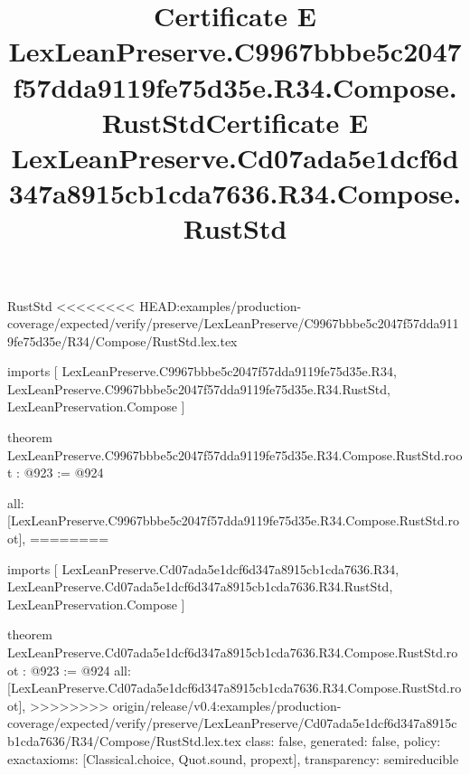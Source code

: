 \begin{lexlean}{RustStd}
<<<<<<<< HEAD:examples/production-coverage/expected/verify/preserve/LexLeanPreserve/C9967bbbe5c2047f57dda9119fe75d35e/R34/Compose/RustStd.lex.tex
\title{Certificate E LexLeanPreserve.C9967bbbe5c2047f57dda9119fe75d35e.R34.Compose.RustStd}
\begin{coremodule}
imports [
  LexLeanPreserve.C9967bbbe5c2047f57dda9119fe75d35e.R34,
  LexLeanPreserve.C9967bbbe5c2047f57dda9119fe75d35e.R34.RustStd,
  LexLeanPreservation.Compose
]

theorem LexLeanPreserve.C9967bbbe5c2047f57dda9119fe75d35e.R34.Compose.RustStd.root : @923 := @924 {
  all: [LexLeanPreserve.C9967bbbe5c2047f57dda9119fe75d35e.R34.Compose.RustStd.root],
========
\title{Certificate E LexLeanPreserve.Cd07ada5e1dcf6d347a8915cb1cda7636.R34.Compose.RustStd}
\begin{coremodule}
imports [
  LexLeanPreserve.Cd07ada5e1dcf6d347a8915cb1cda7636.R34,
  LexLeanPreserve.Cd07ada5e1dcf6d347a8915cb1cda7636.R34.RustStd,
  LexLeanPreservation.Compose
]

theorem LexLeanPreserve.Cd07ada5e1dcf6d347a8915cb1cda7636.R34.Compose.RustStd.root : @923 := @924 {
  all: [LexLeanPreserve.Cd07ada5e1dcf6d347a8915cb1cda7636.R34.Compose.RustStd.root],
>>>>>>>> origin/release/v0.4:examples/production-coverage/expected/verify/preserve/LexLeanPreserve/Cd07ada5e1dcf6d347a8915cb1cda7636/R34/Compose/RustStd.lex.tex
  class: false,
  generated: false,
  policy: exact{axioms: [Classical.choice, Quot.sound, propext]},
  transparency: semireducible
}


\end{coremodule}}
\end{coremodule}
\end{lexlean}
